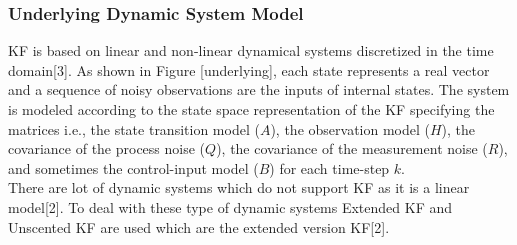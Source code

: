 \subsubsection{Underlying Dynamic System Model}
KF is based on linear and non-linear dynamical systems discretized in the time domain[3]. As shown in Figure [underlying], each state represents a real vector and a sequence of noisy observations are the inputs of internal states. The system is modeled according to the state space representation of the KF specifying the matrices i.e., the state transition model ($A$), the observation model ($H$), the covariance of the process noise ($Q$), the covariance of the measurement noise ($R$), and sometimes the control-input model ($B$) for each time-step $k$.\\
There are lot of dynamic systems which do not support KF as it is a linear model[2]. To deal with these type of dynamic systems Extended KF and Unscented KF are used which are the extended version KF[2].